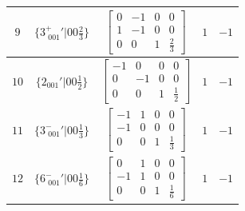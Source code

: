 \documentclass[fleqn,8pt]{jsarticle}
\begin{document}
\begin{longtable}{ccccc}
$ 9 $ & $ \{3^{+}_{\,\,001}{}'|0 0 \frac{2}{3}\} $ & $ \begin{bmatrix} 0 & -1 & 0 & 0 \\ 1 & -1 & 0 & 0 \\ 0 & 0 & 1 & \frac{2}{3} \end{bmatrix} $ & $ 1 $ & $ -1 $ \\ \hline
$ 10 $ & $ \{2{}_{001}{}'|0 0 \frac{1}{2}\} $ & $ \begin{bmatrix} -1 & 0 & 0 & 0 \\ 0 & -1 & 0 & 0 \\ 0 & 0 & 1 & \frac{1}{2} \end{bmatrix} $ & $ 1 $ & $ -1 $ \\ \hline
$ 11 $ & $ \{3^{-}_{\,\,001}{}'|0 0 \frac{1}{3}\} $ & $ \begin{bmatrix} -1 & 1 & 0 & 0 \\ -1 & 0 & 0 & 0 \\ 0 & 0 & 1 & \frac{1}{3} \end{bmatrix} $ & $ 1 $ & $ -1 $ \\ \hline
$ 12 $ & $ \{6^{-}_{\,\,001}{}'|0 0 \frac{1}{6}\} $ & $ \begin{bmatrix} 0 & 1 & 0 & 0 \\ -1 & 1 & 0 & 0 \\ 0 & 0 & 1 & \frac{1}{6} \end{bmatrix} $ & $ 1 $ & $ -1 $ \\
\end{longtable}
\end{document}
